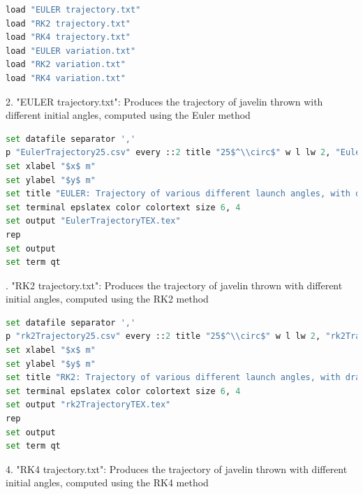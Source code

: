 \documentclass[12pt]{article}
\begin{document}
\begin{lstlisting}[language=Python, caption="Script.txt"]
load "EULER trajectory.txt"
load "RK2 trajectory.txt"
load "RK4 trajectory.txt"
load "EULER variation.txt"
load "RK2 variation.txt"
load "RK4 variation.txt"
\end{lstlisting}
2. "EULER trajectory.txt": Produces the trajectory of javelin thrown with different initial angles, computed using the Euler method
\begin{lstlisting}[language=Python, caption="EULER trajectory.txt"]
set datafile separator ','
p "EulerTrajectory25.csv" every ::2 title "25$^\\circ$" w l lw 2, "EulerTrajectory30.csv" every ::2 title "30$^\\circ$" w l lw 2,"EulerTrajectory38.csv" every ::2 title "38$^\\circ$" w l lw 2,"EulerTrajectory45.csv" every ::2 title "45$^\\circ$" w l lw 2,"EulerTrajectory50.csv" every ::2 title "50$^\\circ$" w l lw 2
set xlabel "$x$ m"
set ylabel "$y$ m"
set title "EULER: Trajectory of various different launch angles, with drag"
set terminal epslatex color colortext size 6, 4
set output "EulerTrajectoryTEX.tex"
rep
set output
set term qt
\end{lstlisting}
. "RK2 trajectory.txt": Produces the trajectory of javelin thrown with different initial angles, computed using the RK2 method
\begin{lstlisting}[language=Python, caption="RK2 trajectory.txt"]
set datafile separator ','
p "rk2Trajectory25.csv" every ::2 title "25$^\\circ$" w l lw 2, "rk2Trajectory30.csv" every ::2 title "30$^\\circ$" w l lw 2,"rk2Trajectory38.csv" every ::2 title "38$^\\circ$" w l lw 2,"rk2Trajectory45.csv" every ::2 title "45$^\\circ$" w l lw 2,"rk2Trajectory50.csv" every ::2 title "50$^\\circ$" w l lw 2
set xlabel "$x$ m"
set ylabel "$y$ m"
set title "RK2: Trajectory of various different launch angles, with drag"
set terminal epslatex color colortext size 6, 4
set output "rk2TrajectoryTEX.tex"
rep
set output
set term qt
\end{lstlisting}
4. "RK4 trajectory.txt": Produces the trajectory of javelin thrown with different initial angles, computed using the RK4 method
\end{document}
